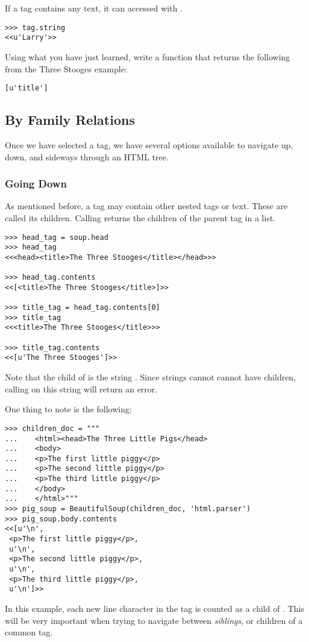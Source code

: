 If a tag contains any text, it can accessed with .
\begin{lstlisting}
>>> tag.string
<<u'Larry'>>
\end{lstlisting}

\begin{problem}
Using what you have just learned, write a function that returns the following from the Three Stooges example:
\begin{lstlisting}
[u'title']
\end{lstlisting}
\end{problem}

\subsection*{By Family Relations}

Once we have selected a tag, we have several options available to navigate up, down, and sideways through an HTML tree.

\subsubsection{Going Down}

As mentioned before, a tag may contain other nested tags or text. These are called its children.
Calling  returns the children of the parent tag in a list.
\begin{lstlisting}
>>> head_tag = soup.head
>>> head_tag
<<<head><title>The Three Stooges</title></head>>>

>>> head_tag.contents
<<[<title>The Three Stooges</title>]>>

>>> title_tag = head_tag.contents[0]
>>> title_tag
<<<title>The Three Stooges</title>>>

>>> title_tag.contents
<<[u'The Three Stooges']>>
\end{lstlisting}
Note that the child of  is the string .
Since strings cannot cannot have children, calling  on this string will return an error.

\begin{info}
One thing to note is the following:
\begin{lstlisting}
>>> children_doc = """
...    <html><head>The Three Little Pigs</head>
...    <body>
...    <p>The first little piggy</p>
...    <p>The second little piggy</p>
...    <p>The third little piggy</p>
...    </body>
...    </html>"""
>>> pig_soup = BeautifulSoup(children_doc, 'html.parser')
>>> pig_soup.body.contents
<<[u'\n',
 <p>The first little piggy</p>,
 u'\n',
 <p>The second little piggy</p>,
 u'\n',
 <p>The third little piggy</p>,
 u'\n']>>
\end{lstlisting}
In this example, each new line character in the  tag is counted as a child of .
This will be very important when trying to navigate between \textit{siblings}, or children of a common tag.
\end{info}

